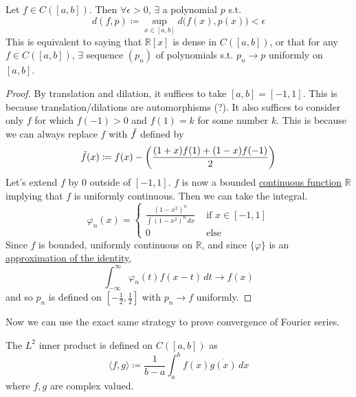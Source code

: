   \begin{theorem}
    \label{thm:stone-weierstrass-theorem}
    Let $f \in C([a, b])$. Then $\forall \epsilon > 0$, $\exists$ a polynomial $p$ s.t. 
    \begin{equation}
      d(f, p) \coloneqq \sup_{x \in [a, b]} d\big( f(x), p(x) ) < \epsilon
    \end{equation}
    This is equivalent to saying that $\mathbb{R}[x]$ is dense in $C([a, b])$, or that for any $f \in C([a, b])$, $\exists$ sequence $(p_n)$ of polynomials s.t. $p_n \to p$ uniformly on $[a, b]$. 
  \end{theorem}
  \begin{proof}
    By translation and dilation, it suffices to take $[a, b] = [-1, 1]$. This is because translation/dilations are automorphisms (?). It also suffices to consider only $f$ for which $f(-1) > 0$ and $f(1) = k$ for some number $k$. This is because we can always replace $f$ with $\Tilde{f}$ defined by 
    \begin{equation}
      \Tilde{f}(x) \coloneqq f(x) - \bigg( \frac{(1 + x) f(1) + (1 - x)f(-1)}{2} \bigg)
    \end{equation} 
    Let's extend $f$ by $0$ outside of $[-1, 1]$. $f$ is now a bounded \hyperref[pst-def:continuous_func]{continuous function} $\mathbb{R}$ implying that $f$ is uniformly continuous. Then we can take the integral. 
    \begin{equation}
      \varphi_n (x) = \begin{cases} 
        \frac{(1 - x^2)^n}{\int (1 - x^2)^n \,dx} & \text{ if } x \in [-1, 1] \\ 
        0 & \text{ else} 
      \end{cases} 
    \end{equation}
    Since $f$ is bounded, uniformly continuous on $\mathbb{R}$, and since $\{\varphi\}$ is an \hyperref[def:approximation-of-the-identity]{approximation of the identity}, 
    \begin{equation}
      \int_{-\infty}^\infty \varphi_n (t) f(x - t) \,dt \to f(x)
    \end{equation} 
    and so $p_n$ is defined on $[-\frac{1}{2}, \frac{1}{2}]$ with $p_n \to f$ uniformly. 
  \end{proof}

  Now we can use the exact same strategy to prove convergence of Fourier series. 

  \begin{definition}
    \label{def:l2-inner-product}
    The $L^2$ inner product is defined on $C([a, b])$ as 
    \begin{equation}
      \langle f, g \rangle \coloneqq \frac{1}{b - a} \int_a^b f(x) \overline{g(x)} \,dx 
    \end{equation}
    where $f, g$ are complex valued. 
  \end{definition}

